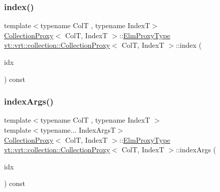 \subsubsection{\texorpdfstring{index()}{index()}}
{\footnotesize\ttfamily template$<$typename ColT , typename IndexT$>$ \\
\hyperlink{structvt_1_1vrt_1_1collection_1_1_collection_proxy}{Collection\+Proxy}$<$ ColT, IndexT $>$\+::\hyperlink{structvt_1_1vrt_1_1collection_1_1_collection_proxy_a892c21eae1dca37321d7973f72b55b0a}{Elm\+Proxy\+Type} \hyperlink{structvt_1_1vrt_1_1collection_1_1_collection_proxy}{vt\+::vrt\+::collection\+::\+Collection\+Proxy}$<$ ColT, IndexT $>$\+::index (\begin{DoxyParamCaption}\item[{IndexT const \&}]{idx }\end{DoxyParamCaption}) const}

\mbox{\label{structvt_1_1vrt_1_1collection_1_1_collection_proxy_a0119b05e9284408d0b6dfc8fc47b12d6}} 
\subsubsection{\texorpdfstring{index\+Args()}{indexArgs()}}
{\footnotesize\ttfamily template$<$typename ColT , typename IndexT $>$ \\
template$<$typename... Index\+ArgsT$>$ \\
\hyperlink{structvt_1_1vrt_1_1collection_1_1_collection_proxy}{Collection\+Proxy}$<$ ColT, IndexT $>$\+::\hyperlink{structvt_1_1vrt_1_1collection_1_1_collection_proxy_a892c21eae1dca37321d7973f72b55b0a}{Elm\+Proxy\+Type} \hyperlink{structvt_1_1vrt_1_1collection_1_1_collection_proxy}{vt\+::vrt\+::collection\+::\+Collection\+Proxy}$<$ ColT, IndexT $>$\+::index\+Args (\begin{DoxyParamCaption}\item[{Index\+ArgsT \&\&...}]{idx }\end{DoxyParamCaption}) const}

\mbox{\label{structvt_1_1vrt_1_1collection_1_1_collection_proxy_a8a06bed8946060c4d1e11f665e05e64f}} 
